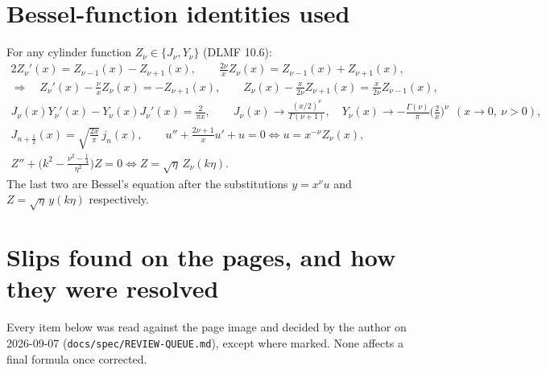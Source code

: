 \documentclass[11pt,a4paper]{article}
\theoremstyle{remark}
\begin{document}
\appendix

\section{Bessel-function identities used}
\label{app:bessel}

For any cylinder function $Z_\nu\in\{J_\nu,Y_\nu\}$ (DLMF 10.6):
\begin{gather}
2Z_\nu'(x) = Z_{\nu-1}(x) - Z_{\nu+1}(x),\qquad
\frac{2\nu}{x}Z_\nu(x) = Z_{\nu-1}(x) + Z_{\nu+1}(x),\\
\Rightarrow\quad Z_\nu'(x) - \frac{\nu}{x}Z_\nu(x) = -Z_{\nu+1}(x),\qquad
Z_\nu(x) - \frac{x}{2\nu}Z_{\nu+1}(x) = \frac{x}{2\nu}Z_{\nu-1}(x),\\
J_\nu(x)Y_\nu'(x) - Y_\nu(x)J_\nu'(x) = \frac{2}{\pi x},\qquad
J_\nu(x)\to\frac{(x/2)^\nu}{\Gamma(\nu+1)},\quad Y_\nu(x)\to-\frac{\Gamma(\nu)}{\pi}\Big(\frac{2}{x}\Big)^\nu\ \ (x\to0,\ \nu>0),\\
J_{n+\frac12}(x) = \sqrt{\frac{2x}{\pi}}\,j_n(x),\qquad
u'' + \frac{2\nu+1}{x}u' + u = 0 \iff u = x^{-\nu}Z_\nu(x),\\
Z'' + \Big(k^2 - \frac{\nu^2-\frac14}{\eta^2}\Big)Z = 0 \iff Z = \sqrt\eta\,Z_\nu(k\eta).
\end{gather}
The last two are Bessel's equation after the substitutions $y = x^{\nu}u$ and $Z = \sqrt\eta\,y(k\eta)$ respectively.

\section{Slips found on the pages, and how they were resolved}
\label{app:slips}

Every item below was read against the page image and decided by the author on 2026-09-07 (\texttt{docs/spec/REVIEW-QUEUE.md}), except where marked. None affects a final formula once corrected.
\end{document}
